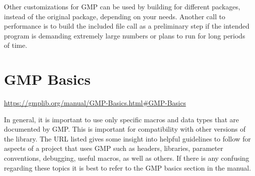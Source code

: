 \medskip

Other customizations for GMP can be used by building for
different packages, instead of the original package,
depending on your needs. Another call to performance is to
build the included file call  as a preliminary
step if the intended program is demanding extremely large
numbers or plans to run for long periods of time.


\section{GMP Basics}

\url{https://gmplib.org/manual/GMP-Basics.html#GMP-Basics}

\medskip

In general, it is important to use only specific macros and
data types that are documented by GMP. This is important for
compatibility with other versions of the library. The URL
listed gives some insight into helpful guidelines to follow
for aspects of a project that uses GMP such as headers,
libraries, parameter conventions, debugging, useful macros,
as well as others. If there is any confusing regarding these
topics it is best to refer to the GMP basics section in the
manual.
